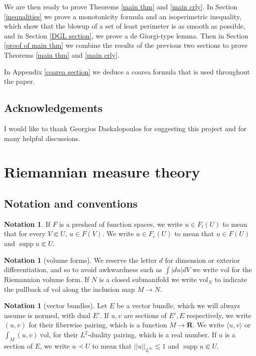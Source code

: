 \documentclass[reqno,12pt,letterpaper]{amsart}
\newcommand{\RR}{\mathbf{R}}
\DeclareMathOperator{\supp}{supp}
\newcommand{\vol}{\mathrm{vol}}
\theoremstyle{definition}
\newtheorem{notation}[theorem]{Notation}
\numberwithin{equation}{section}
\begin{document}
We are then ready to prove Theorems \ref{main thm} and \ref{main crly}.
In Section \ref{inequalities} we prove a monotonicity formula and an isoperimetric inequality, which show that the blowup of a set of least perimeter is as smooth as possible, and in Section \ref{DGL section}, we prove a de Giorgi-type lemma.
Then in Section \ref{proof of main thm} we combine the results of the previous two sections to prove Theorems \ref{main thm} and \ref{main crly}.

In Appendix \ref{coarea section} we deduce a coarea formula that is used throughout the paper.


\subsection{Acknowledgements}
I would like to thank Georgios Daskalopoulos for suggesting this project and for many helpful discussions.


\section{Riemannian measure theory}
\subsection{Notation and conventions}
\begin{notation}
If $F$ is a presheaf of function spaces, we write $u \in F_l(U)$ to mean that for every $V \Subset U$, $u \in F(V)$.
We write $u \in F_c(U)$ to mean that $u \in F(U)$ and $\supp u \Subset U$.
\end{notation}

\begin{notation}[volume forms]
We reserve the letter $d$ for dimension or exterior differentiation, and so to avoid awkwardness such as $\int |du| dV$ we write $\vol$ for the Riemannian volume form.
If $N$ is a closed submanifold we write $\vol_N$ to indicate the pullback of $\vol$ along the inclusion map $M \to N$.
\end{notation}

\begin{notation}[vector bundles]
Let $E$ be a vector bundle, which we will always assume is normed, with dual $E'$.
If $u,v$ are sections of $E',E$ respectively, we write $(u, v)$ for their fiberwise pairing, which is a function $M \to \RR$.
We write $\langle u, v\rangle$ or $\int_M (u, v) ~\vol$, for their $L^2$-duality pairing, which is a real number.
If $u$ is a section of $E$, we write $u \prec U$ to mean that $||u||_{L^\infty} \lesssim 1$ and $\supp u \Subset U$.
\end{notation}
\end{document}
